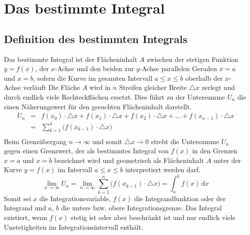 \section{Das bestimmte Integral}
\subsection{Definition des bestimmten Integrals}
Das bestimmte Integral ist der Flächeninhalt $A$ zwischen der stetigen Funktion $y=f\left(x\right)$, der $x$-Achse und den beiden zur $y$-Achse parallelen Geraden $x=a$ und $x=b$, sofern die Kurve im gesamten Intervall $a\leq x\leq b$ oberhalb der $x$-Achse verläuft
\newline\newline
Die Fläche $A$ wird in $n$ Streifen gleicher Breite $\triangle x$ zerlegt und durch endlich viele Rechteckflächen ersetzt. Dies führt zu der Untersumme $U_n$ die einen Näherungswert für den gesuchten Flächeninhalt darstellt.
\begin{equation}
\boxed{
\begin{array}{lll}
U_n&=&f\left(x_0\right)\cdot \triangle x+f\left(x_1\right)\cdot \triangle x+f\left(x_2\right)\cdot \triangle x+\dotso+f\left(x_{n-1}\right)\cdot \triangle x\\
&=&\displaystyle \sum_{k=1}^n\Big(f\left(x_{k-1}\right)\cdot \triangle x\Big)\\
\end{array}}
\end{equation}
Beim Grenzübergang $n\rightarrow \infty$ und somit $\triangle x\rightarrow 0$ strebt die Untersumme $U_n$ gegen einen Grenzwert, der als bestimmtes Integral von $f\left(x\right)$ in den Grenzen $x=a$ und $x=b$ bezeichnet wird und geometrisch als Flächeninhalt $A$ unter der Kurve $y=f\left(x\right)$ im Intervall $a\leq x\leq b$ interpretiert werden darf.
\begin{equation}
\boxed{\displaystyle \lim_{n\rightarrow \infty}U_n=\displaystyle \lim_{n\rightarrow \infty}\displaystyle \sum_{k=1}^n\Big(f\left(x_{k-1}\right)\cdot \triangle x\Big)=\displaystyle \int_a^bf\left(x\right)\,\text{d}x}
\end{equation}
Somit sei $x$ die Integrationsvariable, $f\left(x\right)$ die Integrandfunktion oder der Integrand und $a,\,b$ die untere bzw. obere Integrationsgrenze. Das Integral existiert, wenn $f\left(x\right)$ stetig ist oder aber beschränkt ist und nur endlich viele Unstetigkeiten im Integrationsintervall enthält. 
